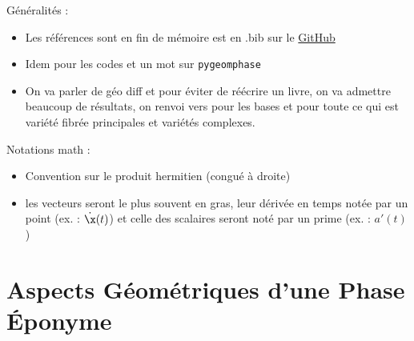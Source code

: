 Généralités :
\begin{itemize}
	
	\item Les références sont en fin de mémoire est en .bib sur le \href{https://github.com/GregoireDoat/StageM2}{GitHub}
	
	\item Idem pour les codes et un mot sur \texttt{pygeomphase}

	\item On va parler de géo diff et pour éviter de réécrire un livre, on va admettre beaucoup de résultats, on renvoi vers \cite{lafontaine_introduction_2015,do_carmo_riemannian_1992} pour les bases et  \cite{nakahara_geometry_2003,pham_mau_quan_introduction_1969,ballmann_lectures_2006} pour toute ce qui est variété fibrée principales et variétés complexes.
	
\end{itemize}
\skipl

Notations math :
\begin{itemize}
	
	\item Convention sur le produit hermitien (congué à droite)
	
	\item les vecteurs seront le plus souvent en gras, leur dérivée en temps notée par un point (ex. : $\dot{\x}(t)$) et celle des scalaires seront noté par un prime (ex. : $a'(t)$)
	
\end{itemize}
\skipl



\newpage










\part{Aspects Géométriques d'une Phase Éponyme} \label{part:phase_geo} 
\begin{annexe}\end{annexe}


